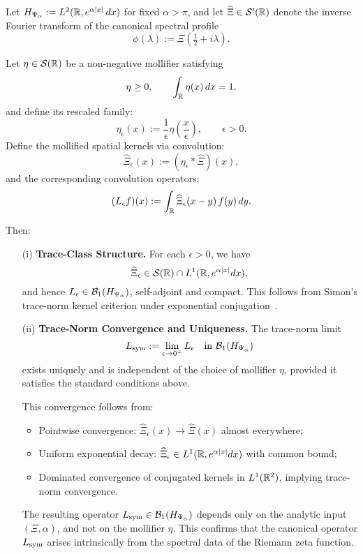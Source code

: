\begin{lemma}
\label{lem:construction_canonical_data}
Let \( H_{\Psi_\alpha} := L^2(\mathbb{R}, e^{\alpha |x|}\, dx) \) for fixed \( \alpha > \pi \), and let \( \widehat{\Xi} \in \mathcal{S}'(\mathbb{R}) \) denote the inverse Fourier transform of the canonical spectral profile
\[
\phi(\lambda) := \Xi\left( \tfrac{1}{2} + i\lambda \right).
\]

Let \( \eta \in \mathcal{S}(\mathbb{R}) \) be a non-negative mollifier satisfying
\[
\eta \ge 0, \qquad \int_{\mathbb{R}} \eta(x)\, dx = 1,
\]
and define its rescaled family:
\[
\eta_\epsilon(x) := \frac{1}{\epsilon} \eta\left( \frac{x}{\epsilon} \right), \qquad \epsilon > 0.
\]
Define the mollified spatial kernels via convolution:
\[
\widehat{\Xi}_\epsilon(x) := (\eta_\epsilon * \widehat{\Xi})(x),
\]
and the corresponding convolution operators:
\[
(L_\epsilon f)(x) := \int_{\mathbb{R}} \widehat{\Xi}_\epsilon(x - y)\, f(y)\, dy.
\]

Then:
\begin{enumerate}
  \item[\textnormal{(i)}] \textbf{Trace-Class Structure.}  
  For each \( \epsilon > 0 \), we have
  \[
  \widehat{\Xi}_\epsilon \in \mathcal{S}(\mathbb{R}) \cap L^1(\mathbb{R}, e^{\alpha |x|} dx),
  \]
  and hence \( L_\epsilon \in \mathcal{B}_1(H_{\Psi_\alpha}) \), self-adjoint and compact.  
  This follows from Simon’s trace-norm kernel criterion under exponential conjugation~\cite[Thm.~3.1]{Simon2005TraceIdeals}.

  \item[\textnormal{(ii)}] \textbf{Trace-Norm Convergence and Uniqueness.}  
  The trace-norm limit
  \[
  L_{\mathrm{sym}} := \lim_{\epsilon \to 0^+} L_\epsilon \quad \text{in } \mathcal{B}_1(H_{\Psi_\alpha})
  \]
  exists uniquely and is independent of the choice of mollifier \( \eta \), provided it satisfies the standard conditions above.

  This convergence follows from:
  \begin{itemize}
    \item Pointwise convergence: \( \widehat{\Xi}_\epsilon(x) \to \widehat{\Xi}(x) \) almost everywhere;
    \item Uniform exponential decay: \( \widehat{\Xi}_\epsilon \in L^1(\mathbb{R}, e^{\alpha |x|} dx) \) with common bound;
    \item Dominated convergence of conjugated kernels in \( L^1(\mathbb{R}^2) \), implying trace-norm convergence.
  \end{itemize}

  The resulting operator \( L_{\mathrm{sym}} \in \mathcal{B}_1(H_{\Psi_\alpha}) \) depends only on the analytic input \( (\Xi, \alpha) \), and not on the mollifier \( \eta \). This confirms that the canonical operator \( L_{\mathrm{sym}} \) arises intrinsically from the spectral data of the Riemann zeta function.
\end{enumerate}
\end{lemma}
